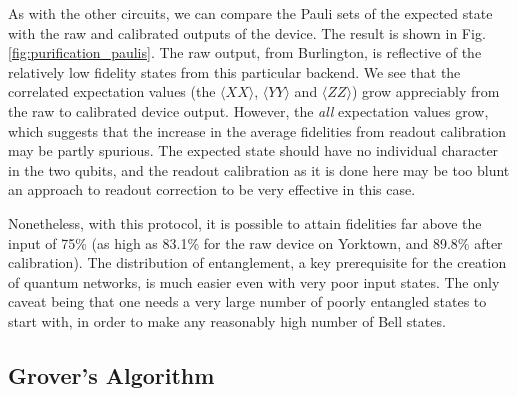 As with the other circuits, we can compare the Pauli sets of the expected state
with the raw and calibrated outputs of the device. The result is shown in Fig.
\ref{fig:purification_paulis}. The raw output, from Burlington, is reflective of
the relatively low fidelity states from this particular backend. We see that the
correlated expectation values (the $\langle XX \rangle$, $\langle YY \rangle$
and $\langle ZZ \rangle$) grow appreciably from the raw to calibrated device
output. However, the \textit{all} expectation values grow, which suggests that
the increase in the average fidelities from readout calibration may be partly
spurious. The expected state should have no individual character in the two
qubits, and the readout calibration as it is done here may be too blunt an
approach to readout correction to be very effective in this case.

Nonetheless, with this protocol, it is possible to attain fidelities far above
the input of 75\% (as high as 83.1\% for the raw device on Yorktown, and 89.8\%
after calibration). The distribution of entanglement, a key prerequisite for the
creation of quantum networks, is much easier even with very poor input states.
The only caveat being that one needs a very large number of poorly entangled
states to start with, in order to make any reasonably high number of Bell states.

\subsection{Grover's Algorithm}


